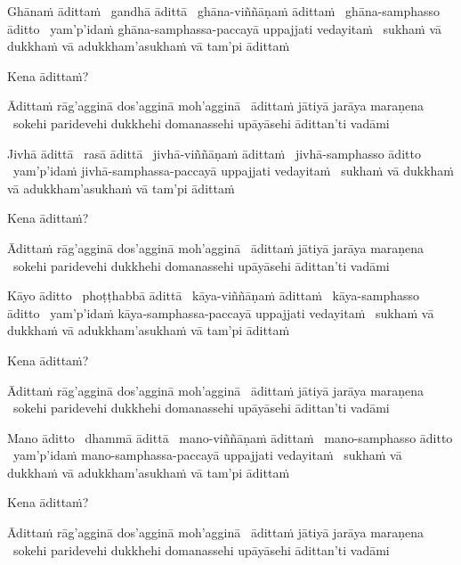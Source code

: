 \begin{pali-hang}
  Ghānaṁ ādittaṁ \breathmark\ gandhā ādittā \breathmark\ ghāna-viññāṇaṁ ādittaṁ \breathmark\ ghāna-samphasso āditto \breathmark\ yam'p'idaṁ ghāna-samphassa-paccayā uppajjati vedayitaṁ \breathmark\ sukhaṁ vā dukkhaṁ vā adukkham'asukhaṁ vā tam'pi ādittaṁ
\end{pali-hang}
\begin{pali-hangtogether}
  Kena ādittaṁ?
\end{pali-hangtogether}
\begin{pali-hangtogether}
  Ādittaṁ rāg'agginā dos'agginā moh'agginā \breathmark\ ādittaṁ jātiyā jarāya maraṇena \breathmark\ sokehi paridevehi dukkhehi domanassehi upāyāsehi ādittan'ti vadāmi
\end{pali-hangtogether}

\begin{pali-hang}
  Jivhā ādittā \breathmark\ rasā ādittā \breathmark\ jivhā-viññāṇaṁ ādittaṁ \breathmark\ jivhā-samphasso āditto \breathmark\ yam'p'idaṁ jivhā-samphassa-paccayā uppajjati vedayitaṁ \breathmark\ sukhaṁ vā dukkhaṁ vā adukkham'asukhaṁ vā tam'pi ādittaṁ
\end{pali-hang}
\begin{pali-hangtogether}
  Kena ādittaṁ?
\end{pali-hangtogether}
\begin{pali-hangtogether}
  Ādittaṁ rāg'agginā dos'agginā moh'agginā \breathmark\ ādittaṁ jātiyā jarāya maraṇena \breathmark\ sokehi paridevehi dukkhehi domanassehi upāyāsehi ādittan'ti vadāmi
\end{pali-hangtogether}

\begin{pali-hang}
  Kāyo āditto \breathmark\ phoṭṭhabbā ādittā \breathmark\ kāya-viññāṇaṁ ādittaṁ \breathmark\ kāya-samphasso āditto \breathmark\ yam'p'idaṁ kāya-samphassa-paccayā uppajjati vedayitaṁ \breathmark\ sukhaṁ vā dukkhaṁ vā adukkham'asukhaṁ vā tam'pi ādittaṁ
\end{pali-hang}
\begin{pali-hangtogether}
  Kena ādittaṁ?
\end{pali-hangtogether}
\begin{pali-hangtogether}
  Ādittaṁ rāg'agginā dos'agginā moh'agginā \breathmark\ ādittaṁ jātiyā jarāya maraṇena \breathmark\ sokehi paridevehi dukkhehi domanassehi upāyāsehi ādittan'ti vadāmi
\end{pali-hangtogether}

\begin{pali-hang}
  Mano āditto \breathmark\ dhammā ādittā \breathmark\ mano-viññāṇaṁ ādittaṁ \breathmark\ mano-samphasso āditto \breathmark\ yam'p'idaṁ mano-samphassa-paccayā uppajjati vedayitaṁ \breathmark\ sukhaṁ vā dukkhaṁ vā adukkham'asukhaṁ vā tam'pi ādittaṁ
\end{pali-hang}
\begin{pali-hangtogether}
  Kena ādittaṁ?
\end{pali-hangtogether}
\begin{pali-hangtogether}
  Ādittaṁ rāg'agginā dos'agginā moh'agginā \breathmark\ ādittaṁ jātiyā jarāya maraṇena \breathmark\ sokehi paridevehi dukkhehi domanassehi upāyāsehi ādittan'ti vadāmi
\end{pali-hangtogether}

